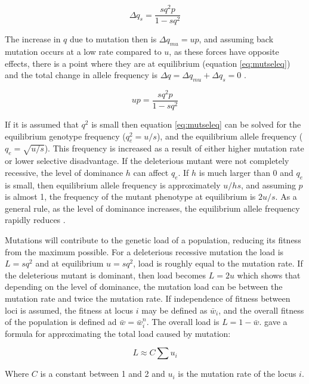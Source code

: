 \begin{equation} \label{eq:mssdel}
\Delta q_s = \frac{sq^2p}{1 - sq^2}
\end{equation}

The increase in $q$ due to mutation then is $\Delta q_{mu} = up$, and assuming back mutation occurs at a low rate compared to $u$, as these forces have opposite effects, there is a point where they are at equilibrium (equation \ref{eq:mutseleq}) and the total change in allele frequency is $\Delta q = \Delta q_{mu} + \Delta q_s = 0$ \parencite{Hedrick2010}. 

\begin{equation} \label{eq:mutseleq}
up = \frac{sq^2p}{1-sq^2}
\end{equation}

If it is assumed that $q^2$ is small then equation \ref{eq:mutseleq} can be solved for the equilibrium genotype frequency ($q_e^2=u/s$), and the equilibrium allele frequency ($q_e=\sqrt{u/s}$).
This frequency is increased as a result of either higher mutation rate or lower selective disadvantage.
If the deleterious mutant were not completely recessive, the level of dominance $h$ can affect $q_e$. 
If $h$ is much larger than 0 and $q_e$ is small, then equilibrium allele frequency is approximately $u/hs$, and assuming $p$ is almost 1, the frequency of the mutant phenotype at equilibrium is $2u/s$.
As a general rule, as the level of dominance increases, the equilibrium allele frequency rapidly reduces \parencite{Hedrick2010}.

Mutations will contribute to the genetic load of a population, reducing its fitness from the maximum possible.
For a deleterious recessive mutation the load is $L = sq^2$ and at equilibrium $u = sq^2$, load is roughly equal to the mutation rate. 
If the deleterious mutant is dominant, then load becomes $L = 2u$ which shows that depending on the level of dominance, the mutation load can be between the mutation rate and twice the mutation rate.
If independence of fitness between loci is assumed, the fitness at locus $i$ may be defined as $\bar{w}_i$, and the overall fitness of the population is defined ad $\bar{w} = \bar{w}_i^n$.
The overall load is $L = 1-\bar{w}$. \cite{Crow1970} gave a formula for approximating the total load caused by mutation:

\begin{equation} \label{eq:totalload}
L \approx C \sum{u_i}
\end{equation}

Where $C$ is a constant between 1 and 2 and $u_i$ is the mutation rate of the locus $i$.

